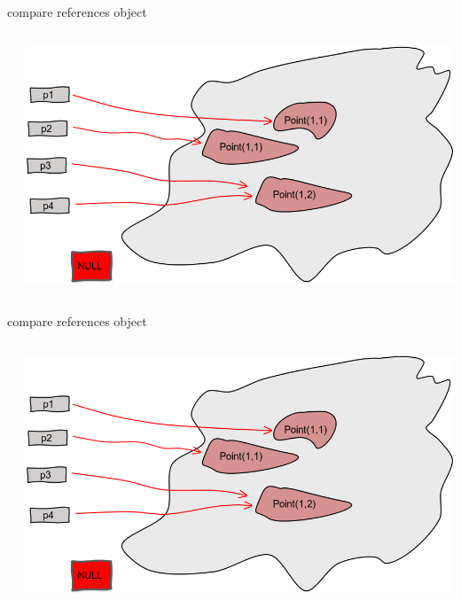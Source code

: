 \documentclass[a4paper, 11pt]{beamer}
\begin{document}

\begin{frame}{compare references object}

\begin{columns}
    \begin{column}{.3\linewidth}
      \inputminted[bgcolor=bg, fontsize=\tiny]{java}{./src/equal/EqualRef.java}        
    \end{column}
\vline
    \begin{column}{.5\linewidth}
       \includegraphics[scale=0.2]{img/equal.png}
   
    \end{column}
  \end{columns}
\end{frame}

\begin{frame}{compare references object}

\begin{columns}
    \begin{column}{.3\linewidth}
      \inputminted[bgcolor=bg, fontsize=\tiny]{java}{./src/equal/EqualRef2.java}        
    \end{column}
\vline
    \begin{column}{.5\linewidth}
       \includegraphics[scale=0.2]{img/equal.png}
   
    \end{column}
  \end{columns}
\end{frame}
\end{document}
